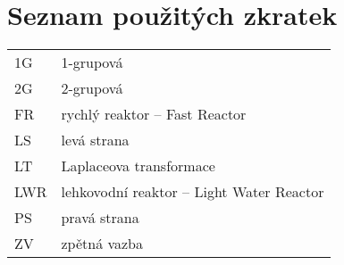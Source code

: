 \section*{Seznam použitých zkratek}

\renewcommand{\arraystretch}{1.2}
\begin{table}[H]
\begin{tabular}{p{1cm}l}
  1G           & 1-grupová \\
  2G           & 2-grupová \\
  FR           & rychlý reaktor -- Fast Reactor \\
  LS           & levá strana \\
  LT           & Laplaceova transformace \\
  LWR          & lehkovodní reaktor -- Light Water Reactor \\
  PS           & pravá strana \\
  ZV           & zpětná vazba \\
\end{tabular}
\end{table}
\renewcommand{\arraystretch}{1}
